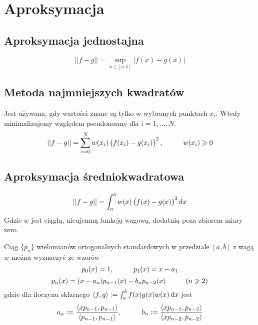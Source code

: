 \documentclass[../mn-notatki.tex]{subfiles}
\begin{document}
\section{Aproksymacja}


\subsection{Aproksymacja jednostajna}

\begin{tcolorbox}
\[
||f-g|| = \sup_{x \in [a,b]} |f(x) - g(x)|
\]
\end{tcolorbox}

\subsection{Metoda najmniejszych kwadratów}

\begin{tcolorbox}
Jest używana, gdy wartości znane są tylko w wybranych punktach $x_i$.
Wtedy minimalizujemy względem pseudonormy
dla $i = 1, \ldots, N$.
\[
||f-g|| = \sum_{i=0}^{N} w(x_i)\left(f(x_i) - g(x_i)\right)^2, \hspace*{1cm} w(x_i) \geqslant 0
\]
\end{tcolorbox}

\subsection{Aproksymacja średniokwadratowa}

\begin{tcolorbox}
\[
||f-g|| = \int_a^b w(x)\left(f(x) - g(x)\right)^2 \dif x
\]
Gdzie $w$ jest ciągłą, nieujemną funkcją wagową, dodatnią poza zbiorem miary zero.
\end{tcolorbox}

\begin{tcolorbox}
Ciąg $\{ p_n \}$ wielomianów ortogonalnych standardowych w przedziale
$[a, b]$ z wagą $w$ można wyznaczyć ze wzorów
\[
p_0(x) = 1
, \hspace*{1cm}
p_1(x) = x - a_1
\]
\[
p_n(x) = (x-a_n)p_{n-1}(x) - b_n p_{n-2}(x) \hspace*{1cm} (n \geqslant 2)
\]
gdzie dla iloczynu sklarnego $\langle f, g \rangle := \int_a^b f(x)g(x)w(x) \dif x$
jest
\[
a_n := \frac{\langle xp_{n-1}, p_{n-1} \rangle}{\langle p_{n-1}, p_{n-1} \rangle},
\hspace*{1cm} b_n := \frac{\langle xp_{n-1}, p_{n-2} \rangle}{\langle xp_{n-2}, p_{n-2} \rangle}
\]
\end{tcolorbox}
\end{document}
